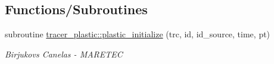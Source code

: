 \subsection*{Functions/\+Subroutines}
\begin{DoxyCompactItemize}
\item 
subroutine \mbox{\hyperlink{namespacetracer__plastic_a9a4e16b71bcd88b95c80ddb9c3ddb7d1}{tracer\+\_\+plastic\+::plastic\+\_\+initialize}} (trc, id, id\+\_\+source, time, pt)
\begin{DoxyCompactList}\small\item\em Birjukovs Canelas -\/ M\+A\+R\+E\+T\+EC \end{DoxyCompactList}\end{DoxyCompactItemize}
